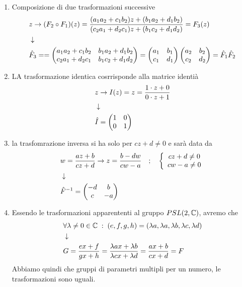 \begin{enumerate}
	\item Composizione di due trasformazioni successive
	\begin{align}
		&z \to (F_2 \circ F_1)(z) = \frac{(a_1 a_2 + c_1b_2)z + (b_1a_2 + d_1 b_2)}{(c_2 a_1 + d_2c_1)z + (b_1c_2 + d_1 d_2)} = F_3(z) \\ &\downarrow \nonumber \\
		&\hat{F}_3 == \begin{pmatrix}
			a_1 a_2 + c_1b_2 & b_1a_2 + d_1 b_2 \\
			c_2 a_1 + d_2c_1 & b_1c_2 + d_1 d_2
		\end{pmatrix} = \begin{pmatrix}
			a_1 & b_1 \\
			c_1 & d_1
		\end{pmatrix}\begin{pmatrix}
			a_2 & b_2 \\
			c_2 & d_2
		\end{pmatrix} = \hat{F}_1 \hat{F}_2
	\end{align}
	\item LA trasformazione identica cosrrisponde alla matrice identià
	\begin{align}
		&z \to I(z) = z = \frac{1 \cdot z + 0 }{0 \cdot z + 1} \\ &\downarrow \nonumber \\
		&\hat{I} = \begin{pmatrix}
			1 & 0 \\
			0 & 1
		\end{pmatrix}
	\end{align}
	\item la trasfomrazione inversa si ha solo per $cz + d \neq 0$ e sarà data da
	\begin{align}
		&w = \frac{az + b}{cz +d} \to z =\frac{b - dw}{cw - a} \quad ; \quad \left\{ \begin{array}{cc} cz + d \neq 0\\ cw -a \neq 0 \end{array} \right.\\ &\downarrow \nonumber \\
		&\hat{F}^{-1}  = \begin{pmatrix}
			-d & b \\
			c & -a
		\end{pmatrix}
	\end{align}
	\item Essendo le trasformazioni apparententi al gruppo $PSL(2,\mathbb{C})$, avremo che 
	\begin{align}
		&\forall \lambda\neq 0 \in \mathbb{C} \; : \; (e,f,g,h) = (\lambda a,\lambda a,\lambda b,\lambda c,\lambda d)\\ &\downarrow \nonumber \\
		&G=\frac{ex + f}{gx + h} = \frac{\lambda ax + \lambda b}{\lambda cx + \lambda d } =\frac{ax + b}{cx + d} = F
	\end{align}
 	Abbiamo quindi che gruppi di parametri multipli per un numero, le trasformazioni sono uguali.
\end{enumerate}

